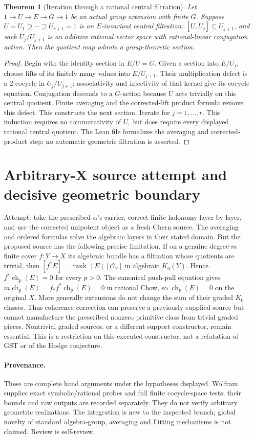 \documentclass[11pt]{article}
\newtheorem{theorem}{Theorem}
\begin{document}
\begin{theorem}[Iteration through a rational central filtration]
Let $1\to U\to E\to G\to1$ be an actual group extension with finite $G$.
Suppose $U=U_1\supseteq\cdots\supseteq U_{r+1}=1$ is an $E$-invariant
central filtration: $[U,U_j]\subseteq U_{j+1}$, and each $U_j/U_{j+1}$
is an additive rational vector space with rational-linear conjugation action.
Then the quotient map admits a group-theoretic section.
\end{theorem}
\begin{proof}
Begin with the identity section in $E/U=G$. Given a section into $E/U_j$,
choose lifts of its finitely many values into $E/U_{j+1}$.
Their multiplication defect is a $2$-cocycle in $U_j/U_{j+1}$; associativity
and injectivity of that kernel give its cocycle equation. Conjugation descends
to a $G$-action because $U$ acts trivially on this central quotient.
Finite averaging and the corrected-lift product formula remove this defect.
This constructs the next section. Iterate for $j=1,\ldots,r$.
This induction requires no commutativity of $U$, but does require every
displayed rational central quotient. The Lean file formalizes the averaging
and corrected-product step; no automatic geometric filtration is asserted.
\end{proof}

\section{Arbitrary-X source attempt and decisive geometric boundary}
Attempt: take the prescribed $\alpha$'s carrier, correct finite holonomy
layer by layer, and use the corrected unipotent object as a fresh Chern source.
The averaging and ordered formulas solve the algebraic layers in their
stated domain. But the proposed source has the following precise limitation.
If on a genuine degree-$m$ finite cover $f:Y\to X$ its algebraic bundle
has a filtration whose quotients are trivial, then
$[f^*E]=\operatorname{rank}(E)[\mathcal O_Y]$ in algebraic $K_0(Y)$.
Hence $f^*\operatorname{ch}_p(E)=0$ for every $p>0$.
The canonical push-pull equation gives
$m\operatorname{ch}_p(E)=f_*f^*\operatorname{ch}_p(E)=0$ in rational Chow,
so $\operatorname{ch}_p(E)=0$ on the original $X$.
More generally extensions do not change the sum of their graded $K_0$
classes. Thus coherence correction can preserve a previously supplied
source but cannot manufacture the prescribed nonzero primitive class from
trivial graded pieces. Nontrivial graded sources, or a different support
constructor, remain essential. This is a restriction on this executed
constructor, not a refutation of GST or of the Hodge conjecture.

\paragraph{Provenance.}
These are complete hand arguments under the hypotheses displayed.
Wolfram supplies exact symbolic/rational probes and full finite cocycle-space
tests; their bounds and raw outputs are recorded separately. They do not
verify arbitrary geometric realizations. The integration is new to the
inspected branch; global novelty of standard algebra-group, averaging and
Fitting mechanisms is not claimed. Review is self-review.
\end{document}
